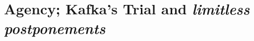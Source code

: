 %
%



\section{Agency; Kafka’s Trial and \textit{limitless postponements}\parencite[5]{deleuze1992a} }
\label{Agency}

